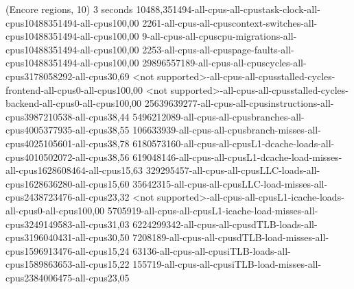 (Encore regions, 10)
3 seconds
10488,351494-all-cpus-all-cpustask-clock-all-cpus10488351494-all-cpus100,00
2261-all-cpus-all-cpuscontext-switches-all-cpus10488351494-all-cpus100,00
9-all-cpus-all-cpuscpu-migrations-all-cpus10488351494-all-cpus100,00
2253-all-cpus-all-cpuspage-faults-all-cpus10488351494-all-cpus100,00
29896557189-all-cpus-all-cpuscycles-all-cpus3178058292-all-cpus30,69
<not supported>-all-cpus-all-cpusstalled-cycles-frontend-all-cpus0-all-cpus100,00
<not supported>-all-cpus-all-cpusstalled-cycles-backend-all-cpus0-all-cpus100,00
25639639277-all-cpus-all-cpusinstructions-all-cpus3987210538-all-cpus38,44
5496212089-all-cpus-all-cpusbranches-all-cpus4005377935-all-cpus38,55
106633939-all-cpus-all-cpusbranch-misses-all-cpus4025105601-all-cpus38,78
6180573160-all-cpus-all-cpusL1-dcache-loads-all-cpus4010502072-all-cpus38,56
619048146-all-cpus-all-cpusL1-dcache-load-misses-all-cpus1628608464-all-cpus15,63
329295457-all-cpus-all-cpusLLC-loads-all-cpus1628636280-all-cpus15,60
35642315-all-cpus-all-cpusLLC-load-misses-all-cpus2438723476-all-cpus23,32
<not supported>-all-cpus-all-cpusL1-icache-loads-all-cpus0-all-cpus100,00
5705919-all-cpus-all-cpusL1-icache-load-misses-all-cpus3249149583-all-cpus31,03
6224299342-all-cpus-all-cpusdTLB-loads-all-cpus3196040431-all-cpus30,50
7208189-all-cpus-all-cpusdTLB-load-misses-all-cpus1596913476-all-cpus15,24
63136-all-cpus-all-cpusiTLB-loads-all-cpus1589863653-all-cpus15,22
155719-all-cpus-all-cpusiTLB-load-misses-all-cpus2384006475-all-cpus23,05
